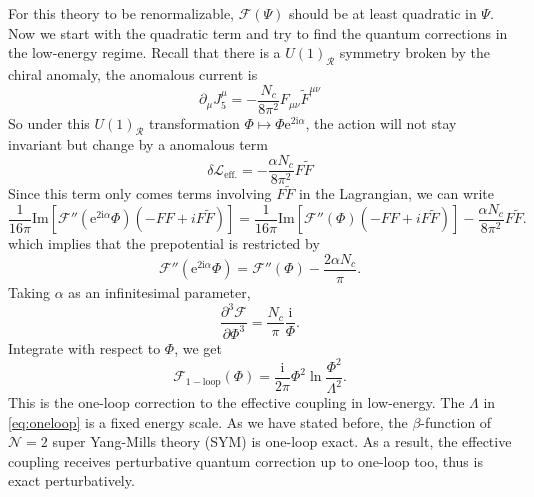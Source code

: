 \documentclass{article}
\begin{document}
For this theory to be renormalizable, $\mathscr{F}(\Psi)$ should be at least quadratic in $\Psi$. Now we start with the quadratic term and try to find the quantum corrections in the low-energy regime. Recall that there is a $U(1)_{\mathscr{R}}$ symmetry broken by the chiral anomaly, the anomalous current is
\begin{equation}
\partial_{\mu} J_{5}^{\mu}=-\frac{N_{c}}{8 \pi^{2}} F_{\mu \nu} \tilde{F}^{\mu \nu}
\end{equation}
So under this $U(1)_{\mathscr{R}}$ transformation $\Phi\mapsto\Phi\mathrm{e}^{2\mathrm{i}\alpha}$, the action will not stay invariant but change by a anomalous term
\begin{equation}
\delta \mathscr{L}_{\mathrm{eff.}}=-\frac{\alpha N_{c}}{8 \pi^{2}} F \tilde{F}
\end{equation}
Since this term only comes terms involving $F\tilde{F}$ in the Lagrangian, we can write
\begin{equation}
\frac{1}{16 \pi} \mathrm{Im}\left[\mathscr{F}''\left(\mathrm{e}^{2\mathrm{i}\alpha} \Phi\right)(-F F+i F \tilde{F})\right]=\frac{1}{16 \pi} \mathrm{Im}\left[\mathscr{F}''(\Phi)(-F F+i F \tilde{F})\right]-\frac{\alpha N_{c}}{8 \pi^{2}} F \tilde{F}.
\end{equation}
which implies that the prepotential is restricted by 
\begin{equation}
\mathscr{F}''\left(\mathrm{e}^{2\mathrm{i}\alpha}\Phi\right)=\mathscr{F}''(\Phi)-\frac{2 \alpha N_{c}}{\pi}.
\end{equation}
Taking $\alpha$ as an infinitesimal parameter, 
\begin{equation}
\frac{\partial^{3} \mathscr{F}}{\partial \Phi^{3}}=\frac{N_{c}}{\pi} \frac{\mathrm{i}}{\Phi}.
\end{equation}
Integrate with respect to $\Phi$, we get
\begin{equation}
\label{eq:oneloop}
\mathscr{F}_{1-\text{loop}}(\Phi)=\frac{\mathrm{i}}{2 \pi} \Phi^{2} \ln \frac{\Phi^{2}}{\Lambda^{2}}.
\end{equation}
This is the one-loop correction to the effective coupling in low-energy. The $\Lambda$ in \eqref{eq:oneloop} is a fixed energy scale. As we have stated before, the $\beta$-function of $\mathcal{N}=2$ super Yang-Mills theory (SYM) is one-loop exact. As a result, the effective coupling receives perturbative quantum correction up to one-loop too, thus is exact perturbatively.
\end{document}
